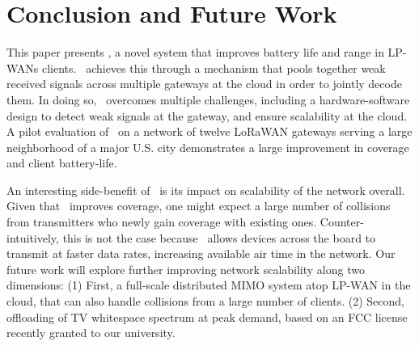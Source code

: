 \section{Conclusion and Future Work}
\label{sec:conclusion}


This paper presents \name, a novel system that improves battery life and range in LP-WANs clients. \name\ achieves this through a mechanism that pools together weak received signals across multiple gateways at the cloud in order to jointly decode them. In doing so, \name\ overcomes multiple challenges, including a hardware-software design to detect weak signals at the gateway, and ensure scalability at the cloud. A pilot evaluation of \name\ on a network of twelve LoRaWAN gateways serving a large neighborhood of a major U.S. city demonstrates a large improvement in coverage and client battery-life.

An interesting side-benefit of \name\ is its impact on scalability of the network overall. Given that \name\ improves coverage, one might expect a large number of collisions from transmitters who newly gain coverage with existing ones. Counter-intuitively, this is not the case because \name\ allows devices across the board to transmit at faster data rates, increasing available air time in the network. Our future work will explore further improving network scalability along two dimensions: (1) First, a full-scale distributed MIMO system atop LP-WAN in the cloud, that can also handle collisions from a large number of clients. (2) Second, offloading of TV whitespace spectrum at peak demand, based on an FCC license recently granted to our university.  



